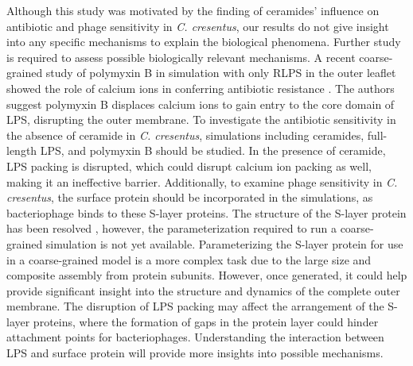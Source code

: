 \documentclass[10pt, letterpaper]{article}
\begin{document}
\newpage

Although this study was motivated by the finding of ceramides' influence on antibiotic and phage sensitivity in \textit{C. cresentus}, our results do not give insight into any specific mechanisms to explain the biological phenomena. Further study is required to assess possible biologically relevant mechanisms. A recent coarse-grained study of polymyxin B in simulation with only RLPS in the outer leaflet showed the role of calcium ions in conferring antibiotic resistance \cite{jiang2021coarse}. The authors suggest polymyxin B displaces calcium ions to gain entry to the core domain of LPS, disrupting the outer membrane. To investigate the antibiotic sensitivity in the absence of ceramide in \textit{C. cresentus}, simulations including ceramides, full-length LPS, and polymyxin B should be studied. In the presence of ceramide, LPS packing is disrupted, which could disrupt calcium ion packing as well, making it an ineffective barrier. 
Additionally, to examine phage sensitivity in \textit{C. cresentus}, the surface protein should be incorporated in the simulations, as bacteriophage binds to these S-layer proteins. The structure of the S-layer protein has been resolved \cite{bharat2017structure}, however, the parameterization required to run a coarse-grained simulation is not yet available. Parameterizing the S-layer protein for use in a coarse-grained model is a more complex task due to the large size and composite assembly from protein subunits. However, once generated, it could help provide significant insight into the structure and dynamics of the complete outer membrane.
The disruption of LPS packing may affect the arrangement of the S-layer proteins, where the formation of gaps in the protein layer could hinder attachment points for bacteriophages. Understanding the interaction between LPS and surface protein will provide more insights into possible mechanisms. 

\newpage


{}
\linespread{1}
\printbibliography
\nocite{*}
\linespread{2}
\newpage
\end{document}
